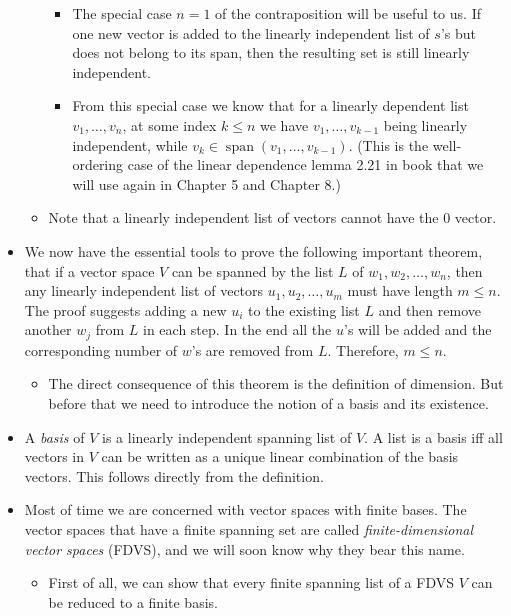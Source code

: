 \documentclass[11pt]{article}
\newcommand{\df}[1]{\textit{\textsf{#1}}}
\newcommand{\s}{\operatorname{span}}
\begin{document}
\begin{itemize}
\begin{itemize}
        \begin{itemize}
            \item The special case $n=1$ of the contraposition will be useful to us. If one new vector is added to the linearly independent list of $s$'s but does not belong to its span, then the resulting set is still linearly independent.
            \item From this special case we know that for a linearly dependent list $v_1,\dots,v_n$, at some index $k \leq n$ we have $v_1,\dots,v_{k-1}$ being linearly independent, while $v_k \in \s(v_1,\dots,v_{k-1})$. (This is the well-ordering case of the linear dependence lemma 2.21 in book that we will use again in Chapter 5 and Chapter 8.)
        \end{itemize}
        \item Note that a linearly independent list of vectors cannot have the $0$ vector.
    \end{itemize}
    \item We now have the essential tools to prove the following important theorem, that if a vector space $V$ can be spanned by the list $L$ of $w_1, w_2, \dots,w_n$, then any linearly independent list of vectors $u_1,u_2,\dots,u_m$ must have length $m \leq n$. The proof suggests adding a new $u_i$ to the existing list $L$ and then remove another $w_j$ from $L$ in each step. In the end all the $u$'s will be added and the corresponding number of $w$'s are removed from $L$. Therefore, $m \leq n$.
    \begin{itemize}
        \item The direct consequence of this theorem is the definition of dimension. But before that we need to introduce the notion of a basis and its existence.
    \end{itemize}
    \item A \df{basis} of $V$ is a linearly independent spanning list of $V$. A list is a basis iff all vectors in $V$ can be written as a unique linear combination of the basis vectors. This follows directly from the definition.
    \item Most of time we are concerned with vector spaces with finite bases. The vector spaces that have a finite spanning set are called \df{finite-dimensional vector spaces} (FDVS), and we will soon know why they bear this name.
    \begin{itemize}
        \item First of all, we can show that every finite spanning list of a FDVS $V$ can be reduced to a finite basis.
        

\end{itemize}
\end{itemize}
\end{document}
